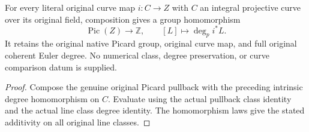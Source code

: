 \begin{theorem}
\label{thm:fc-original-picard-curve-degree}
\leanok
{}
For every literal original curve map $i:C\to Z$ with $C$ an integral
projective curve over its original field, composition gives a group
homomorphism
\[
 \operatorname{Pic}(Z)\longrightarrow\mathbb Z,
 \qquad [L]\longmapsto\deg_p i^*L.
\]
It retains the original native Picard group, original curve map, and
full original coherent Euler degree. No numerical class, degree
preservation, or curve comparison datum is supplied.
\end{theorem}
\begin{proof}
Compose the genuine original Picard pullback with the preceding
intrinsic degree homomorphism on $C$. Evaluate using the actual
pullback class identity and the actual line class degree identity.
The homomorphism laws give the stated additivity on all original
line classes.
\end{proof}
